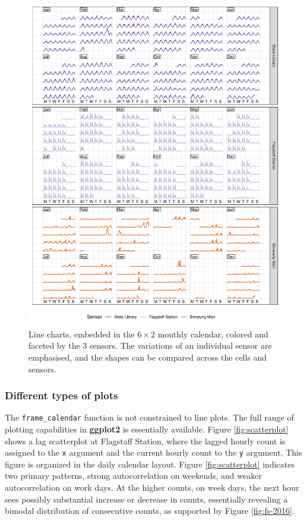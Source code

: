 \documentclass[12pt]{article}
\begin{document}
\begin{figure}

{\centering \includegraphics[width=\textwidth]{figure/facet-1} 

}

\caption{Line charts, embedded in the $6 \times 2$ monthly calendar, colored and faceted by the 3 sensors. The variations of an individual sensor are emphasised, and the shapes can be compared across the cells and sensors.}\label{fig:facet}
\end{figure}

\hypertarget{different-types-of-plots}{%
\subsubsection{Different types of
plots}\label{different-types-of-plots}}

The \texttt{frame\_calendar} function is not constrained to line plots.
The full range of plotting capabilities in \textbf{ggplot2} is
essentially available. Figure \ref{fig:scatterplot} shows a lag
scatterplot at Flagstaff Station, where the lagged hourly count is
assigned to the \texttt{x} argument and the current hourly count to the
\texttt{y} argument. This figure is organized in the daily calendar
layout. Figure \ref{fig:scatterplot} indicates two primary patterns,
strong autocorrelation on weekends, and weaker autocorrelation on work
days. At the higher counts, on week days, the next hour sees possibly
substantial increase or decrease in counts, essentially revealing a
bimodal distribution of consecutive counts, as supported by Figure
\ref{fig:fs-2016}.
\end{document}
